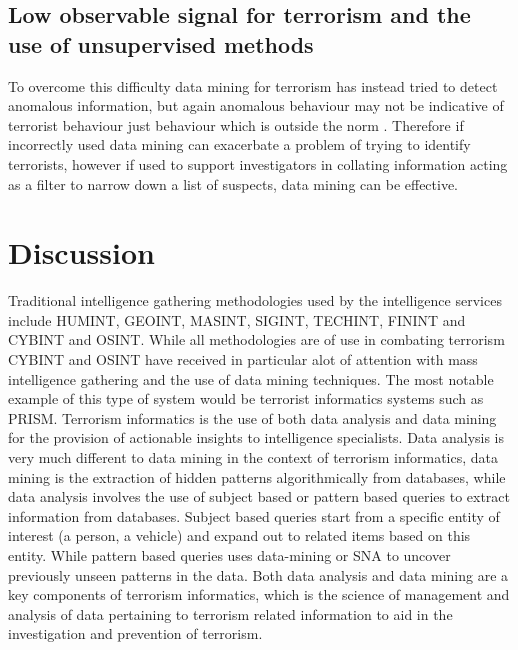 \subsection{Low observable signal for terrorism and the use of unsupervised methods}

To overcome this difficulty data mining for terrorism has instead tried to detect anomalous information, but again anomalous behaviour may not be indicative of terrorist behaviour just behaviour which is outside the norm \citep{thuraisingham2004data}. Therefore if incorrectly used data mining can exacerbate a problem of trying to identify terrorists, however if used to support investigators in collating information acting as a filter to narrow down a list of suspects, data mining can be effective.

\section{Discussion}

Traditional intelligence gathering methodologies used by the intelligence services include  HUMINT, GEOINT, MASINT, SIGINT, TECHINT, FININT and CYBINT and OSINT. While all methodologies are of use in combating terrorism CYBINT and OSINT have received in particular alot of attention with mass intelligence gathering and the use of data mining techniques. 
The most notable example of this type of system would be terrorist informatics systems such as PRISM. Terrorism informatics is the use of both data analysis and data mining for the provision of actionable insights to intelligence specialists. Data analysis is very much different to data mining in the context of terrorism informatics, data mining is the extraction of hidden patterns algorithmically from databases, while data analysis involves the use of subject based or pattern based queries to extract information from databases. Subject based queries start from a specific entity of interest (a person, a vehicle) and expand out to related items based on this entity. While pattern based queries uses data-mining or SNA to uncover previously unseen patterns in the data. Both data analysis and data mining are a key components of terrorism informatics,  which is the science of management and analysis of data pertaining to terrorism related information to aid in the investigation and prevention of terrorism.

